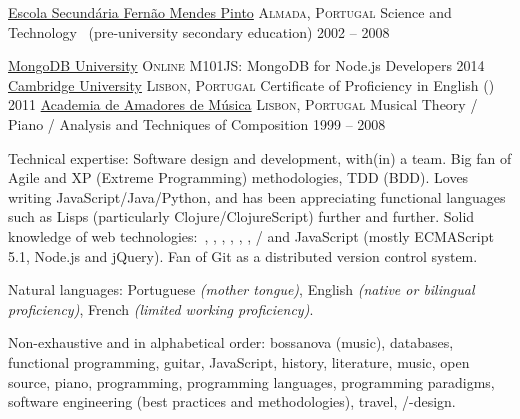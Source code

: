 \documentclass[10pt,a4paper]{article}
\begin{document}
\headedsection
  {\href{http://www.esfmp.pt}{Escola Secundária Fernão Mendes Pinto}}
  {\textsc{Almada, Portugal}} {
  \headedsubsection
    {Science and Technology \textnormal{~(pre-university secondary education)}}
    {2002 -- 2008}
    {}
}

\spacedhrule{0.5em}{-0.4em}

\headedsection
  {\href{https://university.mongodb.com}{MongoDB University}}
  {\textsc{Online}} {
  \headedsubsection
    {M101JS: MongoDB for Node.js Developers}
    {2014}
    {}
}
\headedsection
  {\href{http://www.cambridgeenglish.org/}{Cambridge University}}
  {\textsc{Lisbon, Portugal}} {
  \headedsubsection
    {Certificate of Proficiency in English ()}
    {2011}
    {}
}
\headedsection
  {\href{http://www.academiaam.com/}{Academia de Amadores de Música}}
  {\textsc{Lisbon, Portugal}} {
  \headedsubsection
    {Musical Theory / Piano / Analysis and Techniques of Composition}
    {1999 -- 2008}
    {}
}

\spacedhrule{0.5em}{-0.4em}

\inlineheadsection  %
  {Technical expertise:}
  {Software design and development, with(in) a team.  Big fan of Agile and XP (Extreme Programming) methodologies, TDD (BDD).  Loves writing JavaScript/\nsp Java/\nsp Python, and has been appreciating functional languages such as Lisps (particularly Clojure/\nsp ClojureScript) further and further.  Solid knowledge of web technologies:\ , , , , , , /\nsp{} and JavaScript (mostly ECMAScript 5.1, Node.js and jQuery). Fan of Git as a distributed version control system.}

\vspace{0.5em}
\inlineheadsection
  {Natural languages:}
  {Portuguese \emph{(mother tongue)}, English \emph{(native or bilingual proficiency)}, French \emph{(limited working proficiency)}.}


\spacedhrule{1.6em}{-0.4em}


\inlineheadsection
  {Non-exhaustive and in alphabetical order:}
  {bossanova (music), databases, functional programming, guitar, JavaScript, history, literature, music, open source, piano, programming, programming languages, programming paradigms, software engineering (best practices and methodologies), travel, /-design.}
\end{document}
